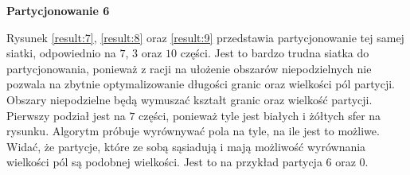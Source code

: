 \vspace{3mm}
\textbf{Partycjonowanie 6}
\vspace{1mm}

Rysunek \ref{result:7}, \ref{result:8} oraz \ref{result:9} przedstawia partycjonowanie tej samej siatki, odpowiednio na
$7$, $3$ oraz $10$ części.
Jest to bardzo trudna siatka do partycjonowania, ponieważ z racji na ułożenie obszarów niepodzielnych
nie pozwala na zbytnie optymalizowanie długości granic oraz wielkości pól partycji.
Obszary niepodzielne będą wymuszać kształt granic oraz wielkość partycji.
Pierwszy podział jest na $7$ części, ponieważ tyle jest białych i żółtych sfer na rysunku.
Algorytm próbuje wyrównywać pola na tyle, na ile jest to możliwe.
Widać, że partycje, które ze sobą sąsiadują i mają możliwość wyrównania wielkości pól są podobnej wielkości.
Jest to na przykład partycja $6$ oraz $0$.
